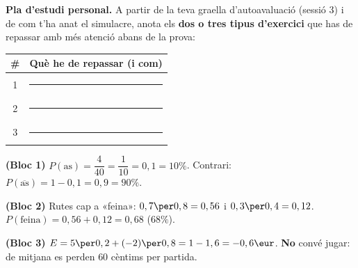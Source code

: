 \noindent\textbf{Pla d'estudi personal.} A partir de la teva graella d'autoavaluació
(sessió 3) i de com t'ha anat el simulacre, anota els \textbf{dos o tres tipus
d'exercici} que has de repassar amb més atenció abans de la prova:
\begin{center}
\renewcommand{\arraystretch}{1.5}
\begin{tabular}{c p{10.5cm}}
\toprule
\textbf{\#} & \textbf{Què he de repassar (i com)} \\
\midrule
1 & \rule{9.8cm}{0.4pt} \\
2 & \rule{9.8cm}{0.4pt} \\
3 & \rule{9.8cm}{0.4pt} \\
\bottomrule
\end{tabular}
\end{center}

\begin{solucions}
\begin{sollist}
  \item \textbf{(Bloc 1)} $P(\text{as})=\dfrac{4}{40}=\dfrac{1}{10}=0,1=10\%$. Contrari:
        $P(\overline{\text{as}})=1-0,1=0,9=90\%$.
  \item \textbf{(Bloc 2)} Rutes cap a «feina»: $0,7\per 0,8=0,56$ i $0,3\per 0,4=0,12$.
        $P(\text{feina})=0,56+0,12=0,68$ ($68\%$).
  \item \textbf{(Bloc 3)} $E=5\per 0,2+(-2)\per 0,8=1-1,6=-0,6\eur$. \textbf{No} convé
        jugar: de mitjana es perden $60$ cèntims per partida.
\end{sollist}
\end{solucions}
